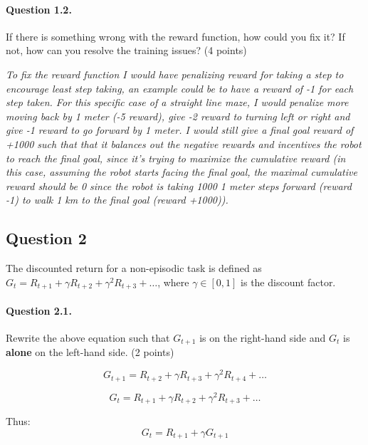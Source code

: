 \documentclass[a4paper,11pt]{article}
\begin{document}
\begin{minipage}{0.9\textwidth}
\vspace{.5cm}
\paragraph{Question 1.2.}
If there is something wrong with the reward function, how could you fix it? If not, how can you resolve the training issues?
(4 points)
\vspace{.5cm}

\textit{To fix the reward function I would have penalizing reward for taking a step to encourage least step taking, an example could be to have a reward of -1 for each step taken. For this specific case of a straight line maze, I would penalize more moving back by 1 meter (-5 reward), give -2 reward to turning left or right and give -1 reward to go forward by 1 meter. I would still give a final goal reward of +1000 such that that it balances out the negative rewards and incentives the robot to reach the final goal, since it's trying to maximize the cumulative reward (in this case, assuming the robot starts facing the final goal, the maximal cumulative reward should be 0 since the robot is taking 1000 1 meter steps forward (reward -1) to walk 1 km to the final goal (reward +1000)). }

\end{minipage}

\newpage
\subsection*{Question 2}
The discounted return for a non-episodic task is defined as $G_t = R_{t+1} + \gamma R_{t+2} + \gamma^2 R_{t+3} + \ldots$, where $\gamma \in [0, 1]$ is the discount factor.

\begin{minipage}{0.9\textwidth}
\vspace{.5cm}
\paragraph{Question 2.1.}
Rewrite the above equation such that $G_{t+1}$ is on the right-hand side and $G_t$ is \textbf{alone} on the left-hand side.
(2 points)
\vspace{.5cm}

\[
G_{t+1} = R_{t+2} + \gamma R_{t+3} + \gamma^2 R_{t+4} + \dots
\]

$$
G_t = R_{t+1} + \gamma R_{t+2} + \gamma^2 R_{t+3} + \ldots
$$

Thus:
\[
G_t = R_{t+1} + \gamma G_{t+1}
\]

\end{minipage}
\end{document}
